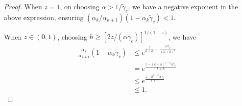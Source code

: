 \documentclass[10pt,a4paper]{amsart}
\newcommand{\lrp}[1]{\left( #1 \right)}
\newcommand{\lrs}[1]{\left[ #1 \right]}
\begin{document}
\begin{proof}
When $z=1$, on choosing $\alpha > 1/\tilde{\gamma}_c$, we have a negative exponent in the above expression, ensuring $(\alpha_{k}/\alpha_{k+1}) (1-\alpha_k \tilde{\gamma}_c) < 1$. 

When $z \in (0,1)$, choosing $h \ge \lrs{2z/(\alpha\tilde{\gamma}_c)}^{1/(1-z)}$, we have
\begin{align*}
    \frac{\alpha_k}{\alpha_{k+1}} \lrp{1 - \alpha_k \tilde{\gamma}_c} &\le e^{ \frac{z}{k+h} - \frac{ \alpha \tilde{\gamma}_c}{(k+h)^z}} \\
    &= e^{ \frac{z - (k+h)^{1-z}\alpha \tilde{\gamma}_c}{k+h}} \\
    &\le e^{ \frac{z - h^{1-z}\alpha \tilde{\gamma}_c}{k+h}}\\
    &\le 1.
\end{align*}
\end{proof}
\end{document}
